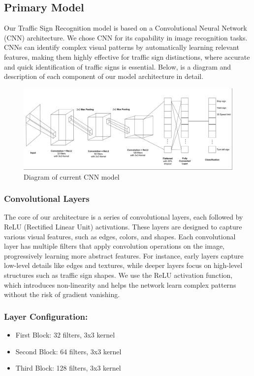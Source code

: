 \documentclass{article} %
\begin{document}
\subsection{Primary Model}
Our Traffic Sign Recognition model is based on a Convolutional Neural Network (CNN) architecture. We chose CNN for its capability in image recognition tasks. CNNs can identify complex visual patterns by automatically learning relevant features, making them highly effective for traffic sign distinctions, where accurate and quick identification of traffic signs is essential. Below, is a diagram and description of each component of our model architecture in detail.


\begin{figure}[h]
\begin{center}
\includegraphics[width=\textwidth]{Figs/DiagramCNN.png}
\end{center}
\caption{Diagram of current CNN model}
\end{figure}

\subsubsection{Convolutional Layers}
The core of our architecture is a series of convolutional layers, each followed by ReLU (Rectified Linear Unit) activations. These layers are designed to capture various visual features, such as edges, colors, and shapes. Each convolutional layer has multiple filters that apply convolution operations on the image, progressively learning more abstract features. For instance, early layers capture low-level details like edges and textures, while deeper layers focus on high-level structures such as traffic sign shapes. We use the ReLU activation function, which introduces non-linearity and helps the network learn complex patterns without the risk of gradient vanishing.

\subsubsection{Layer Configuration:}
\begin{itemize}
    \item First Block: 32 filters, 3x3 kernel
    \item Second Block: 64 filters, 3x3 kernel
    \item Third Block: 128 filters, 3x3 kernel
\end{itemize}
\end{document}

